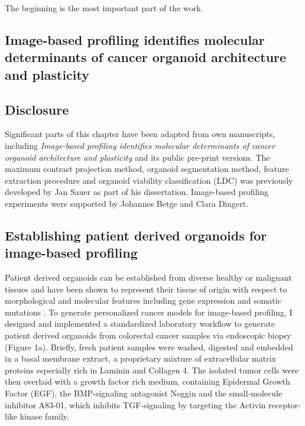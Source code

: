 \begin{savequote}[75mm]
The beginning is the most important part of the work.
\end{savequote}

\begin{flushleft}
\chapter{Image-based profiling identifies molecular determinants of cancer organoid architecture and plasticity}

\newpage

\section{Disclosure}
Significant parts of this chapter have been adapted from own manuscripts, including \textit{Image-based profiling identifies molecular determinants of cancer organoid architecture and plasticity} \cite{Betge2019MultiparametricOrganoids} and its public pre-print versions. The maximum contrast projection method, organoid segmentation method, feature extraction procedure and organoid viability classification (LDC) was previously developed by Jan Sauer as part of his dissertation. Image-based profiling experiments were supported by Johannes Betge and Clara Dingert. 

\section{Establishing patient derived organoids for image-based profiling}

Patient derived organoids can be established from diverse healthy or malignant tissues and have been shown to represent their tissue of origin with respect to morphological and molecular features including gene expression and somatic mutations \cite{Fujii:2016jo, Weeber2015-sn, Van_De_Wetering2015-ko, Sato:2011-1h,  Broutier2017-wg}. To generate personalized cancer models for image-based profiling, I designed and implemented a standardized laboratory workflow to generate patient derived organoids from colorectal cancer samples via endoscopic biopsy (Figure 1a). Briefly, fresh patient samples were washed, digested and embedded in a basal membrane extract, a proprietary mixture of extracellular matrix proteins especially rich in Laminin and Collagen 4. The isolated tumor cells were then overlaid with a growth factor rich medium, containing Epidermal Growth Factor (EGF), the BMP-signaling antagonist Noggin and the small-molecule inhibitor A83-01, which inhibits TGF\beta-signaling by targeting the Activin receptor-like kinase family.


\end{flushleft}
